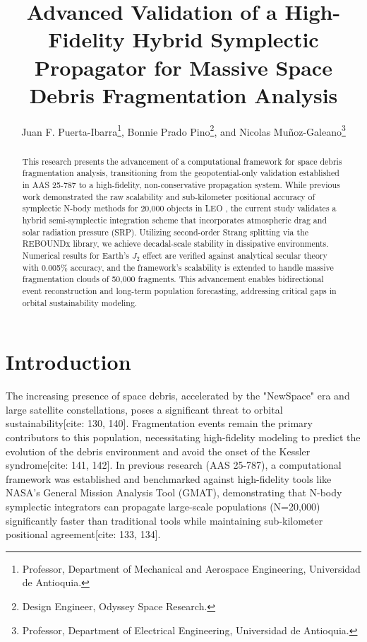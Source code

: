 \documentclass[conf]{AAS} %
\title{Advanced Validation of a High-Fidelity Hybrid Symplectic Propagator for Massive Space Debris Fragmentation Analysis}
\author{Juan F. Puerta-Ibarra\thanks{Professor, Department of Mechanical and Aerospace Engineering, Universidad de Antioquia.}, Bonnie Prado Pino\thanks{Design Engineer, Odyssey Space Research.}, and Nicolas Muñoz-Galeano\thanks{Professor, Department of Electrical Engineering, Universidad de Antioquia.}}
\begin{document}
\maketitle


\begin{abstract}
This research presents the advancement of a computational framework for space debris fragmentation analysis, transitioning from the geopotential-only validation established in AAS 25-787 \cite{Puerta2025} to a high-fidelity, non-conservative propagation system. While previous work demonstrated the raw scalability and sub-kilometer positional accuracy of symplectic N-body methods for 20,000 objects in LEO \cite{Puerta2025}, the current study validates a hybrid semi-symplectic integration scheme that incorporates atmospheric drag and solar radiation pressure (SRP). Utilizing second-order Strang splitting via the REBOUNDx library, we achieve decadal-scale stability in dissipative environments. Numerical results for Earth's $J_2$ effect are verified against analytical secular theory with 0.005\% accuracy, and the framework's scalability is extended to handle massive fragmentation clouds of 50,000 fragments. This advancement enables bidirectional event reconstruction and long-term population forecasting, addressing critical gaps in orbital sustainability modeling.
\end{abstract}

\section{Introduction}
The increasing presence of space debris, accelerated by the "NewSpace" era and large satellite constellations, poses a significant threat to orbital sustainability[cite: 130, 140]. Fragmentation events remain the primary contributors to this population, necessitating high-fidelity modeling to predict the evolution of the debris environment and avoid the onset of the Kessler syndrome[cite: 141, 142]. In previous research (AAS 25-787), a computational framework was established and benchmarked against high-fidelity tools like NASA's General Mission Analysis Tool (GMAT), demonstrating that N-body symplectic integrators can propagate large-scale populations (N=20,000) significantly faster than traditional tools while maintaining sub-kilometer positional agreement[cite: 133, 134].
\end{document}
